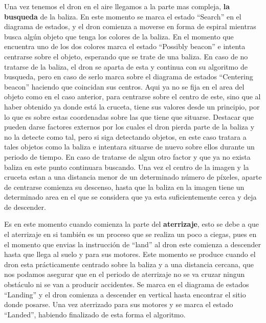 \hspace{1cm} Una vez tenemos el dron en el aire llegamos a la parte mas compleja, \textbf{la busqueda} de la baliza. En este momento se marca el estado "`Search"' en el diagrama de estados, y el dron comienza a moverse en forma de espiral mientras busca alg\'un objeto que tenga los colores de la baliza. En el momento que encuentra uno de los dos colores marca el estado "`Possibly beacon"' e intenta centrarse sobre el objeto, esperando que se trate de una baliza. En caso de no tratarse de la baliza, el dron se aparta de esta y continua con su algoritmo de busqueda, pero en caso de serlo marca sobre el diagrama de estados "`Centering beacon"' haciendo que coincidan sus centros. Aqui ya no se fija en el area del objeto como en el caso anterior, para centrarse sobre el centro de este, sino que al haber obtenido ya donde est\'a la cruceta, tiene sus valores desde un principio, por lo que es sobre estas coordenadas sobre las que tiene que situarse. Destacar que pueden darse factores externos por los cuales el dron pierda parte de la baliza y no la detecte como tal, pero si siga detectando objetos, en este caso tratara a tales objetos como la baliza e intentara situarse de nuevo sobre ellos durante un periodo de tiempo. En caso de tratarse de algun otro factor y que ya no exista baliza en este punto continuara buscando. Una vez el centro de la imagen y la cruceta estan a una distancia menor de un determinado n\'umero de p\'ixeles, aparte de centrarse comienza su descenso, hasta que la baliza en la imagen tiene un determinado area en el que se considera que ya esta suficientemente cerca y deja de descender. 

\hspace{1cm} Es en este momento cuando comienza la parte del \textbf{aterrizaje}, esto se debe a que el aterrizaje en si tambi\'en es un proceso que se realiza un poco a ciegas, pues en el momento que envias la instrucci\'on de "`land"' al dron este comienza a descender hasta que llega al suelo y para sus motores. Este momento se produce cuando el dron esta pr\'acticamente centrado sobre la baliza y a una distancia cercana, que nos podamos asegurar que en el periodo de aterrizaje no se va cruzar ningun obst\'aculo ni se van a producir accidentes. Se marca en el diagrama de estados "`Landing"' y el dron comienza a descender en vertical hasta encontrar el sitio donde posarse. Una vez aterrizado para sus motores y se marca el estado "`Landed"', habiendo finalizado de esta forma el algoritmo. 


